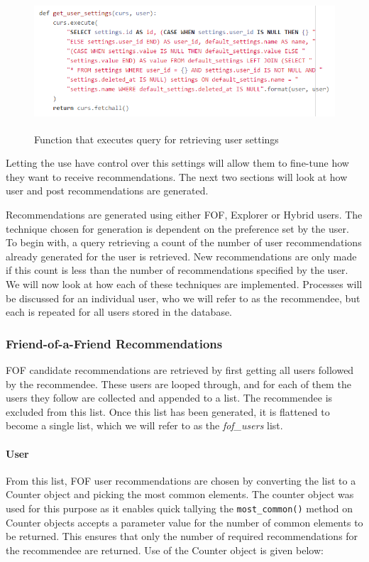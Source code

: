 \begin{figure}[H]
\centering
\includegraphics[height=2in]{Images/Implementation/RecommendationSettings}
\caption{Function that executes query for retrieving user settings}
\label{fig:RecommendationSettings}
\end{figure}

\noindent Letting the use have control over this settings will allow them to fine-tune how they want to receive recommendations. The next two sections will look at how user and post recommendations are generated.

Recommendations are generated using either FOF, Explorer or Hybrid users. The technique chosen for generation is dependent on the preference set by the user. To begin with, a query retrieving a count of the number of user recommendations already generated for the user is retrieved. New recommendations are only made if this count is less than the number of recommendations specified by the user. We will now look at how each of these techniques are implemented. Processes will be discussed for an individual user, who we will refer to as the recommendee, but each is repeated for all users stored in the database.

\subsubsection{Friend-of-a-Friend Recommendations}
FOF candidate recommendations are retrieved by first getting all users followed by the recommendee. These users are looped through, and for each of them the users they follow are collected and appended to a list. The recommendee is excluded from this list. Once this list has been generated, it is flattened to become a single list, which we will refer to as the \textit{fof\_users} list.

\paragraph{User} From this list, FOF user recommendations are chosen by converting the list to a Counter object and picking the most common elements. The counter object was used for this purpose as it enables quick tallying \cite{Python:Counter} the \texttt{most\_common()} method on Counter objects accepts a parameter value for the number of common elements to be returned. This ensures that only the number of required recommendations for the recommendee are returned. Use of the Counter object is given below:

